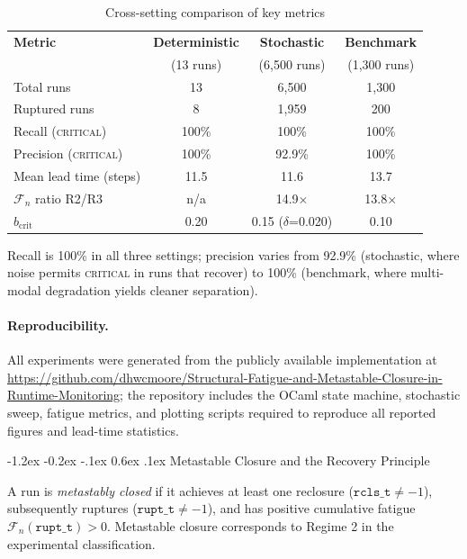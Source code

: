 \documentclass{llncs}
\makeatletter
\renewcommand\section{\@startsection{section}{1}{\z@}%
  {-1.2ex \@plus -0.2ex \@minus -.1ex}%
  {0.6ex \@plus .1ex}%
  {\normalfont\large\bfseries}}
\newcommand{\st}[1]{\textup{\textsc{#1}}}
\makeatother
\begin{document}
\begin{table}[tbp]
\centering
\caption{Cross-setting comparison of key metrics}
\label{tab:comparison}
\small
\begin{tabular}{lccc}
\toprule
\textbf{Metric} & \textbf{Deterministic} & \textbf{Stochastic} & \textbf{Benchmark} \\
 & (13 runs) & (6,500 runs) & (1,300 runs) \\
\midrule
Total runs            & 13    & 6,500   & 1,300 \\
Ruptured runs         & 8     & 1,959   & 200 \\
Recall (\st{critical}) & 100\% & 100\% & 100\% \\
Precision (\st{critical}) & 100\% & 92.9\% & 100\% \\
Mean lead time (steps) & 11.5 & 11.6 & 13.7 \\
$\mathcal{F}_n$ ratio R2/R3 & n/a & 14.9$\times$ & 13.8$\times$ \\
$b_{\mathrm{crit}}$ & 0.20 & 0.15 ($\delta$=0.020) & 0.10 \\
\bottomrule
\end{tabular}
\end{table}

\begin{observation}
Recall is 100\% in all three settings; precision varies from 92.9\%
(stochastic, where noise permits \st{critical} in runs that recover)
to 100\% (benchmark, where multi-modal degradation yields cleaner
separation).
\end{observation}

\paragraph{Reproducibility.}
All experiments were generated from the publicly available implementation
at \url{https://github.com/dhwcmoore/Structural-Fatigue-and-Metastable-Closure-in-Runtime-Monitoring};
the repository includes the OCaml state machine, stochastic sweep,
fatigue metrics, and plotting scripts required to reproduce all
reported figures and lead-time statistics.

\section{Metastable Closure and the Recovery Principle}
\label{sec:mrp}

\begin{definition}
\label{def:metastable}
A run is \emph{metastably closed} if it achieves at least one reclosure
($\mathtt{rcls\_t} \neq -1$), subsequently ruptures
($\mathtt{rupt\_t} \neq -1$), and has positive cumulative fatigue
$\mathcal{F}_n(\mathtt{rupt\_t}) > 0$. Metastable closure corresponds
to Regime 2 in the experimental classification.
\end{definition}
\end{document}
